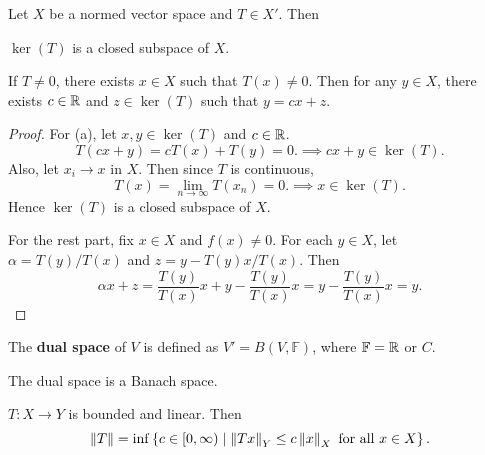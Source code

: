\begin{proposition}
    Let $X$ be a normed vector space and $T\in X'$. Then 
    \begin{thmenum}
        \item $\ker(T)$ is a closed subspace of $X$. 
        \item If $T\neq 0$, there exists $x\in X$ such that 
        $T(x)\neq 0$. Then for any $y\in X$, there exists 
        $c\in\mathbb{R}$ and $z\in\ker(T)$ such that $y = cx+z$.
    \end{thmenum}
\end{proposition}
\begin{proof}
    For (a), let $x,y\in\ker(T)$ and $c\in\mathbb{R}$. 
    \begin{equation*}
        T(cx+y) = cT(x)+T(y) = 0. \implies cx+y\in\ker(T).
    \end{equation*}
    Also, let $x_i\to x$ in $X$. Then since $T$ is continuous,  
    \begin{equation*}
        T(x) = \lim_{n\to\infty} T(x_n) = 0. \implies x\in\ker(T).
    \end{equation*}
    Hence $\ker(T)$ is a closed subspace of $X$. 

    For the rest part, fix $x\in X$ and $f(x)\neq 0$. For each 
    $y\in X$, let $\alpha = T(y)/T(x)$ and $z = y - T(y)x/T(x)$. 
    Then 
    \begin{equation*}
        \alpha x + z = \frac{T(y)}{T(x)}x + y - \frac{T(y)}{T(x)}x 
        = y - \frac{T(y)}{T(x)}x = y.
    \end{equation*}
\end{proof}

\begin{definition}
    The \textbf{dual space} of $V$ is defined as $V' = B(V,\mathbb{F})$, 
    where $\mathbb{F} = \mathbb{R}$ or $C$.
\end{definition}
\begin{remark}
    The dual space is a Banach space.
\end{remark}
\begin{remark}
    $T:X\to Y$ is bounded and linear. Then 
    \begin{equation*}
        \left\lVert {T} \right\rVert = \inf\left\{ c\in [0,\infty) \;\middle\vert\; \left\lVert {Tx} \right\rVert_Y \leq c\left\lVert {x} \right\rVert_X \text{ for all } x\in X \right\}.
    \end{equation*}
\end{remark}

